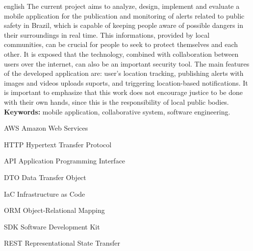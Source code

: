 \documentclass[
	12pt,				%
	openright,			%
	oneside,			%
	a4paper,			%
	english,			%
	french,				%
	spanish,			%
	brazil,				%
	]{lib/abntex2}
\newcommand{\listofquadrosname}{Lista de quadros}
\begin{document}
\begin{resumo}[Abstract]
	\begin{otherlanguage*}{english}
		The current project aims to analyze, design, implement and evaluate a mobile application for the publication and monitoring of alerts related to public safety in Brazil, which is capable of keeping people aware of possible dangers in their surroundings in real time. This informations, provided by local communities, can be crucial for people to seek to protect themselves and each other. It is exposed that the technology, combined with collaboration between users over the internet, can also be an important security tool. The main features of the developed application are: user's location tracking, publishing alerts with images and videos uploads suports, and triggering location-based notifications. It is important to emphasize that this work does not encourage justice to be done with their own hands, since this is the responsibility of local public bodies.
		\\
		\textbf{Keywords:} mobile application, collaborative system, software engineering.
	\end{otherlanguage*}
\end{resumo}

\listoffigures*
\cleardoublepage



\begin{siglas}
	\item[AWS] Amazon Web Services
	\item[HTTP] Hypertext Transfer Protocol
	\item[API] Application Programming Interface
	\item[DTO] Data Transfer Object
	\item[IaC] Infrastructure as Code
	\item[ORM] Object-Relational Mapping
	\item[SDK] Software Development Kit
	\item[REST] Representational State Transfer
\end{siglas}
\end{document}
